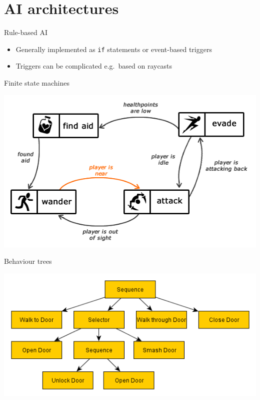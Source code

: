 \part{AI architectures}
\frame{\partpage}

\begin{frame}{Rule-based AI}
	\begin{itemize}
		\pause\item Generally implemented as \texttt{if} statements or event-based triggers
		\pause\item Triggers can be complicated e.g.\ based on raycasts
	\end{itemize}
\end{frame}

\begin{frame}{Finite state machines}
	\begin{center}
		\includegraphics[width=\textwidth]{fsm_enemy_brain}
	\end{center}
\end{frame}

\begin{frame}{Behaviour trees}
	\begin{center}
		\includegraphics[width=\textwidth]{behaviour_tree}
	\end{center}
\end{frame}


